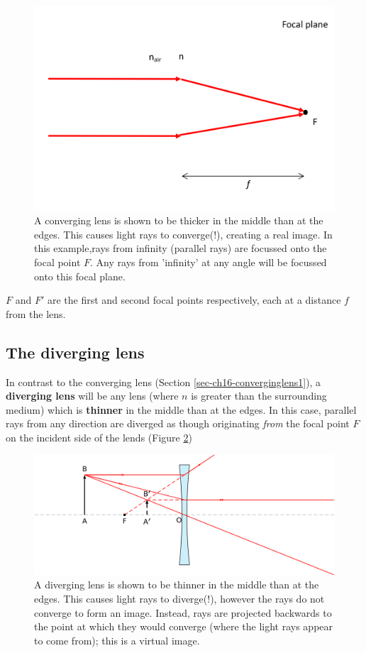 \documentclass[
]{book}
\begin{document}
\begin{figure}

{\centering \includegraphics[width=0.7\linewidth]{visualisations/LaTeX/ch16-focalplane1} 

}

\caption{A converging lens is shown to be thicker in the middle than at the edges. This causes light rays to converge(!), creating a real image. In this example,rays from infinity (parallel rays) are focussed onto the focal point $F$. Any rays from 'infinity' at any angle will be focussed onto this focal plane.}\label{fig:ch16-converginglens1}
\end{figure}

\(F\) and \(F'\) are the first and second focal points respectively, each at a distance \(f\) from the lens.

\hypertarget{sec-ch16-diverginglens1}{%
\subsection{The diverging lens}\label{sec-ch16-diverginglens1}}

In contrast to the converging lens (Section \ref{sec-ch16-converginglens1}), a \textbf{diverging lens} will be any lens (where \(n\) is greater than the surrounding medium) which is \textbf{thinner} in the middle than at the edges. In this case, parallel rays from any direction are diverged as though originating \emph{from} the focal point \(F\) on the incident side of the lends (Figure \ref{fig:ch16-diverginglens1})

\begin{figure}

{\centering \includegraphics[width=0.7\linewidth]{visualisations/LaTeX/ch16-diverginglens1} 

}

\caption{A diverging lens is shown to be thinner in the middle than at the edges. This causes light rays to diverge(!), however the rays do not converge to form an image. Instead, rays are projected backwards to the point at which they would converge (where the light rays appear to come from); this is a virtual image. }\label{fig:ch16-diverginglens1}
\end{figure}
\end{document}
